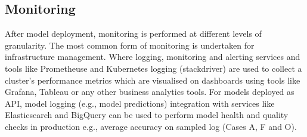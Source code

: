 
\subsection{Monitoring}
After model deployment, monitoring is performed at different levels of granularity. The most common form of monitoring is undertaken for infrastructure management. Where logging, monitoring and alerting services and tools like Prometheuse and Kubernetes logging (stackdriver) are used to collect a cluster's performance metrics which are visualised on dashboards using tools like Grafana, Tableau or any other business analytics tools. For models deployed as API, model logging (e.g., model predictions) integration with services like Elasticsearch and BigQuery can be used to perform model health and quality checks in production e.g., average accuracy on sampled log (Cases A, F and O).



